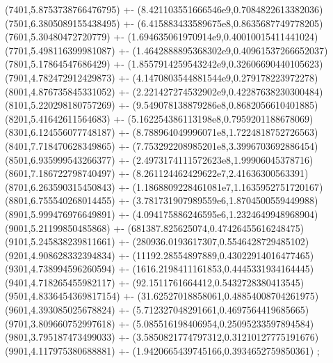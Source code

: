 {(7401,5.8753738766476795) +- (8.421103551666546e9,0.7084822613382036)
(7501,6.3805089155438495) +- (6.415883433589675e8,0.8635687749778205)
(7601,5.30480472720779) +- (1.694635061970914e9,0.40010015411441024)
(7701,5.498116399981087) +- (1.4642888895368302e9,0.40961537266652037)
(7801,5.17864547686429) +- (1.8557914259543242e9,0.32606690440105623)
(7901,4.782472912429873) +- (4.1470803544881544e9,0.279178223972278)
(8001,4.876735845331052) +- (2.221427274532902e9,0.42287638230300484)
(8101,5.220298180757269) +- (9.549078138879286e8,0.8682056610401885)
(8201,5.41642611564683) +- (5.162254386113198e8,0.7959201188678069)
(8301,6.124556077748187) +- (8.788964049996071e8,1.7224818752726563)
(8401,7.718470628349865) +- (7.753292208985201e8,3.3996703692886454)
(8501,6.935999543266377) +- (2.4973174111572623e8,1.99906045378716)
(8601,7.186722798740497) +- (8.261124462429622e7,2.41636300563391)
(8701,6.263590315450843) +- (1.1868809228461081e7,1.1635952751720167)
(8801,6.755540268014455) +- (3.781731907989559e6,1.8704500559449988)
(8901,5.999476976649891) +- (4.094175886246595e6,1.2324649948968904)
(9001,5.21199850485868) +- (681387.825625074,0.47426455616248475)
(9101,5.245838239811661) +- (280936.0193617307,0.5546428729485102)
(9201,4.908628332394834) +- (11192.28554897889,0.43022914016477465)
(9301,4.738994596260594) +- (1616.2198411161853,0.4445331934164445)
(9401,4.718265455982117) +- (92.1511761664412,0.5432728380413545)
(9501,4.8336454369817154) +- (31.62527018858061,0.48854008704261975)
(9601,4.393085025678824) +- (5.712327048291661,0.4697564419685665)
(9701,3.809660752997618) +- (5.085516198406954,0.25095233597894584)
(9801,3.795187473499033) +- (3.5850821774797312,0.31210127775191676)
(9901,4.117975380688881) +- (1.9420665439745166,0.3934652759850361)
};
